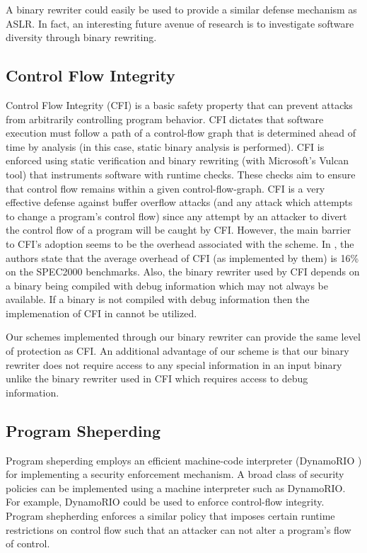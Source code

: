 A binary rewriter could easily be used to provide a similar defense mechanism as ASLR. In fact, an
interesting future avenue of research is to investigate software diversity through binary rewriting.

\subsection{Control Flow Integrity}

Control Flow Integrity (CFI) \cite{cfi-05} is a basic safety property that can prevent attacks from
arbitrarily controlling program behavior. CFI dictates that software execution must follow a path of
a control-flow graph that is determined ahead of time by analysis (in this case, static binary
analysis is performed). CFI is enforced using static verification and binary rewriting (with
Microsoft's Vulcan tool) that instruments software with runtime checks. These checks aim to ensure
that control flow remains within a given control-flow-graph. CFI is a very effective defense against
buffer overflow attacks (and any attack which attempts to change a program's control flow) since any
attempt by an attacker to divert the control flow of a program will be caught by CFI. However, the
main barrier to CFI's adoption seems to be the overhead associated with the scheme. In \cite{cfi-05},
the authors state that the average overhead of CFI (as implemented by them) is 16\% on the SPEC2000
benchmarks. Also, the binary rewriter used by CFI depends on a binary being compiled with debug
information which may not always be available. If a binary is not compiled with debug information
then the implemenation of CFI in \cite{cfi-05} cannot be utilized.

Our schemes implemented through our binary rewriter can provide the same level of protection as CFI.
An additional advantage of our scheme is that our binary rewriter does not require access to any
special information in an input binary unlike the binary rewriter used in CFI which requires access
to debug information.

\subsection{Program Sheperding}

Program sheperding employs an efficient machine-code interpreter (DynamoRIO \cite{drio}) for
implementing a security enforcement mechanism. A broad class of security policies can be implemented
using a machine interpreter such as DynamoRIO. For example, DynamoRIO could be used to enforce
control-flow integrity. Program shepherding enforces a similar policy that imposes certain runtime
restrictions on control flow such that an attacker can not alter a program's flow of control.

